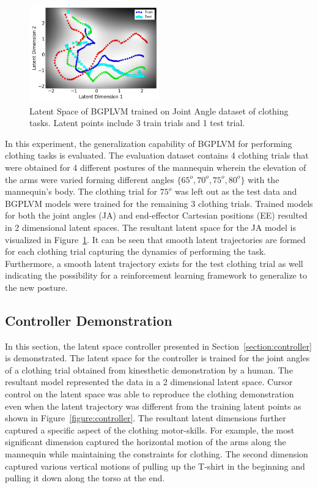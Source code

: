 \documentclass{article}
\begin{document}
\begin{figure}[t]
  \centering
  \includegraphics[width=0.5\textwidth]{latentspace.png}
  \caption{Latent Space of BGPLVM trained on Joint Angle dataset of clothing tasks. Latent points include 3 train trials and 1 test trial.}
  \label{figure:latent}
\end{figure}

In this experiment, the generalization capability of BGPLVM for performing clothing tasks is evaluated. The evaluation dataset contains 4 clothing trials that were obtained for 4 different postures of the mannequin wherein the elevation of the arms were varied forming different angles $\{65^o, 70^o, 75^o, 80^o\}$ with the mannequin's body. The clothing trial for $75^o$ was left out as the test data and BGPLVM models were trained for the remaining 3 clothing trials. Trained models for both the joint angles (JA) and end-effector Cartesian positions (EE) resulted in 2 dimensional latent spaces. The resultant latent space for the JA model is visualized in Figure~\ref{figure:latent}. It can be seen that smooth latent trajectories are formed for each clothing trial capturing the dynamics of performing the task. Furthermore, a smooth latent trajectory exists for the test clothing trial as well indicating the possibility for a reinforcement learning framework to generalize to the new posture.

\subsection{Controller Demonstration}
\label{section:controllerres}

In this section, the latent space controller presented in Section~\ref{section:controller} is demonstrated. The latent space for the controller is trained for the joint angles of a clothing trial obtained from kinesthetic demonstration by a human. The resultant model represented the data in a 2 dimensional latent space. Cursor control on the latent space was able to reproduce the clothing demonstration even when the latent trajectory was different from the training latent points as shown in Figure~\ref{figure:controller}. The resultant latent dimensions further captured a specific aspect of the clothing motor-skills. For example, the most significant dimension captured the horizontal motion of the arms along the mannequin while maintaining the constraints for clothing. The second dimension captured various vertical motions of pulling up the T-shirt in the beginning and pulling it down along the torso at the end.
\end{document}
